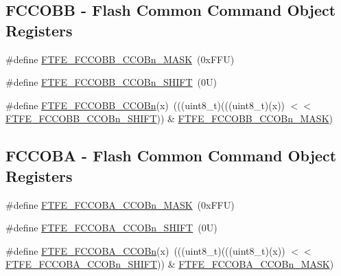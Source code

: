 \subsection*{F\+C\+C\+O\+BB -\/ Flash Common Command Object Registers}
\begin{DoxyCompactItemize}
\item 
\#define \mbox{\hyperlink{group___f_t_f_e___register___masks_ga0c4f10213e785664769dccd3f31c19d9}{F\+T\+F\+E\+\_\+\+F\+C\+C\+O\+B\+B\+\_\+\+C\+C\+O\+Bn\+\_\+\+M\+A\+SK}}~(0x\+F\+F\+U)
\item 
\#define \mbox{\hyperlink{group___f_t_f_e___register___masks_ga486d3dca3c7da56602168363f9c474c2}{F\+T\+F\+E\+\_\+\+F\+C\+C\+O\+B\+B\+\_\+\+C\+C\+O\+Bn\+\_\+\+S\+H\+I\+FT}}~(0\+U)
\item 
\#define \mbox{\hyperlink{group___f_t_f_e___register___masks_gab601b12b309d08fd70c8ac7ffb71a8a5}{F\+T\+F\+E\+\_\+\+F\+C\+C\+O\+B\+B\+\_\+\+C\+C\+O\+Bn}}(x)~(((uint8\+\_\+t)(((uint8\+\_\+t)(x)) $<$$<$ \mbox{\hyperlink{group___f_t_f_e___register___masks_ga486d3dca3c7da56602168363f9c474c2}{F\+T\+F\+E\+\_\+\+F\+C\+C\+O\+B\+B\+\_\+\+C\+C\+O\+Bn\+\_\+\+S\+H\+I\+FT}})) \& \mbox{\hyperlink{group___f_t_f_e___register___masks_ga0c4f10213e785664769dccd3f31c19d9}{F\+T\+F\+E\+\_\+\+F\+C\+C\+O\+B\+B\+\_\+\+C\+C\+O\+Bn\+\_\+\+M\+A\+SK}})
\end{DoxyCompactItemize}
\subsection*{F\+C\+C\+O\+BA -\/ Flash Common Command Object Registers}
\begin{DoxyCompactItemize}
\item 
\#define \mbox{\hyperlink{group___f_t_f_e___register___masks_gacec52ac0397aa60e5278a27225d3506b}{F\+T\+F\+E\+\_\+\+F\+C\+C\+O\+B\+A\+\_\+\+C\+C\+O\+Bn\+\_\+\+M\+A\+SK}}~(0x\+F\+F\+U)
\item 
\#define \mbox{\hyperlink{group___f_t_f_e___register___masks_gadac1a605014d4879d27ac5a1b5707c5e}{F\+T\+F\+E\+\_\+\+F\+C\+C\+O\+B\+A\+\_\+\+C\+C\+O\+Bn\+\_\+\+S\+H\+I\+FT}}~(0\+U)
\item 
\#define \mbox{\hyperlink{group___f_t_f_e___register___masks_ga39ad820ef25dff9352ef452ec48142e5}{F\+T\+F\+E\+\_\+\+F\+C\+C\+O\+B\+A\+\_\+\+C\+C\+O\+Bn}}(x)~(((uint8\+\_\+t)(((uint8\+\_\+t)(x)) $<$$<$ \mbox{\hyperlink{group___f_t_f_e___register___masks_gadac1a605014d4879d27ac5a1b5707c5e}{F\+T\+F\+E\+\_\+\+F\+C\+C\+O\+B\+A\+\_\+\+C\+C\+O\+Bn\+\_\+\+S\+H\+I\+FT}})) \& \mbox{\hyperlink{group___f_t_f_e___register___masks_gacec52ac0397aa60e5278a27225d3506b}{F\+T\+F\+E\+\_\+\+F\+C\+C\+O\+B\+A\+\_\+\+C\+C\+O\+Bn\+\_\+\+M\+A\+SK}})
\end{DoxyCompactItemize}
